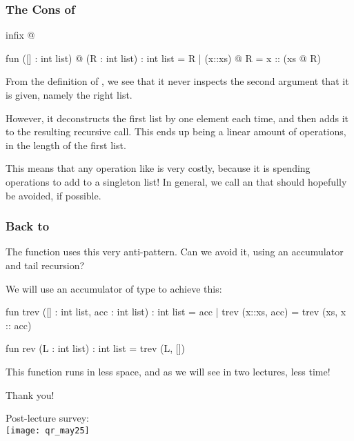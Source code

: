 \documentclass[aspectratio=169]{beamer}
\begin{document}
\begin{frame}[fragile]
  \frametitle{The Cons of }

  \begin{codeblock}
    infix @ 

    fun ([] : int list) @ (R : int list) : int list = R  
      | (x::xs) @ R = x :: (xs @ R) 
  \end{codeblock}

  \pause
  From the definition of , we see that it never inspects the second argument that it
  is given, namely the right list.

  \pause
  \vspace{\fill}

  However, it deconstructs the first list by one element each time, and then adds it to the
  resulting recursive call. This ends up being a linear amount of operations, in the length
  of the first list.

  \pause
  \vspace{\fill}

  This means that any operation like  is very costly, because it is spending
   operations to add to a singleton list! In general, we call  an
   that should hopefully be avoided, if possible.
\end{frame}

\begin{frame}[fragile]
  \frametitle{Back to }

  The  function uses this very anti-pattern. Can we avoid it, using an accumulator
  and tail recursion?

  \pause
  \vspace{\fill}

  We will use an accumulator of type  to achieve this: 

  \pause
  \begin{codeblock}
    fun trev ([] : int list, acc : int list) : int list = acc
      | trev (x::xs, acc) = trev (xs, x :: acc)

    fun rev (L : int list) : int list = trev (L, [])
  \end{codeblock}

  \pause
  \vspace{\fill}

  This  function runs in less space, and as we will see in two lectures,
  less time!
\end{frame}

\begin{frame}[plain]
	\begin{center} Thank you! \end{center}

	\begin{center} 
    Post-lecture survey: \\
    \vspace{5pt}
    \texttt{[image: qr\_may25]}
  \end{center}
\end{frame}
\end{document}
